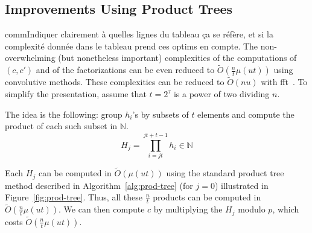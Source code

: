 \documentclass[11pt]{llncs}
\newcommand{\Oapp}{\ensuremath{\tilde{O}}}
\begin{document}
\subsection{Improvements Using Product Trees}

comm{Indiquer clairement à quelles lignes du tableau ça se réfère, et si la complexité donnée dans le tableau prend ces optims en compte.}
The non-overwhelming (but nonetheless important) complexities of the computations of $(c,c')$ and of the factorizations can be even reduced to $\Oapp(\frac{n}{t} \mu(u t))$ using convolutive methods. These complexities can be reduced to $\Oapp(n u)$ with {\sc fft}~\cite{schonhage1971schnelle}. To simplify the presentation, assume that $t=2^\tau$ is a power of two dividing $n$.

The idea is the following: group $h_i$'s by subsets of $t$ elements and compute the product of each such subset in $\mathbb{N}$.
\[ H_j = \prod_{i=j t}^{j t + t - 1} h_i\in\mathbb{N} \]

Each $H_j$ can be computed in $\Oapp(\mu(u t))$ using the standard product tree method described in Algorithm~\ref{alg:prod-tree} (for $j=0$) illustrated in Figure~\ref{fig:prod-tree}.
Thus, all these $\frac{n}{t}$ products can be computed in $\Oapp(\frac{n}{t} \mu(u t))$. We can then compute $c$ by multiplying the $H_j$ modulo $p$, which costs $\Oapp(\frac{n}{t} \mu(u t))$.\smallskip
\end{document}
